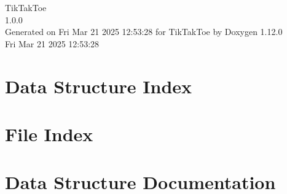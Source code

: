 \documentclass[twoside]{book}
\newcommand{\+}{\discretionary{\mbox{\scriptsize$\hookleftarrow$}}{}{}}
\newcommand{\clearemptydoublepage}{%
    \newpage{\pagestyle{empty}\cleardoublepage}%
  }
\begin{document}
  \raggedbottom
    \hypersetup{pageanchor=false,
                bookmarksnumbered=true,
                pdfencoding=unicode
               }
  \begin{titlepage}
  \vspace*{7cm}
  \begin{center}%
  {\Large Tik\+Tak\+Toe}\\
  [1ex]\large 1.\+0.\+0 \\
  \vspace*{1cm}
  {\large Generated on Fri Mar 21 2025 12\+:53\+:28 for Tik\+Tak\+Toe by Doxygen 1.12.0}\\
    \vspace*{0.5cm}
    {\small Fri Mar 21 2025 12:53:28}
  \end{center}
  \end{titlepage}
  \clearemptydoublepage
  \tableofcontents
  \clearemptydoublepage
  \hypersetup{pageanchor=true}



\chapter{Data Structure Index}

\chapter{File Index}

\chapter{Data Structure Documentation}







\end{document}
